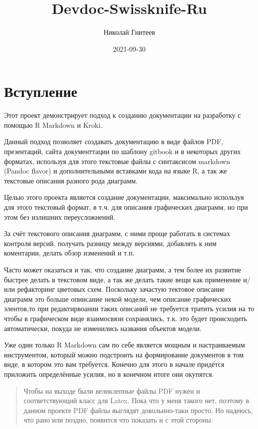 \documentclass[12pt,a4paper,12pt,oneside,openany]{book}
\title{Devdoc-Swissknife-Ru}
\author{Николай Гнитеев}
\date{2021-09-30}
\begin{document}
\maketitle

{
\hypersetup{linkcolor=black}
\setcounter{tocdepth}{2}
\tableofcontents
}
\chapter*{Вступление}


Этот проект демонстрирует подход к созданию документации на разработку с помощью R Markdown и Kroki.

Данный подход позволяет создавать документацию в виде файлов PDF, презентаций, сайта документтации по шаблону gitbook и в некоторых других форматах, используя для этого текстовые файлы с синтаксисом markdown (Pandoc flavor) и дополнительными вставками кода на языке R, а так же текстовые описания разного рода диаграмм.

Целью этого проекта является создание документации, максимально используя для этого текстовый формат, в т.ч. для описания графических диаграмм, но при этом без излишних переусложнений.

За счёт текстового описания диаграмм, с ними проще работать в системах контроля версий, получать разницу между версиями, добавлять к ним коментарии, делать обзор изменений и т.п.

Часто может оказаться и так, что создание диаграмм, а тем более их развитие быстрее делать в текстовом виде, а так же делать такие вещи как применение и/или рефакторинг цветовых схем. Поскольку зачастую тектовое описание диаграмм это больше опиисание некой модели, чем описание графических элентов,то при редактирвоании таких описаний не требуется тратить усилия на то чтобы в графическом виде взаимосвязи сохранялись, т.к. это будет происходить автоматически, покуда не изменились названия объектов модели.

Уже один только R Markdown сам по себе является мощным и настраиваемым инструментом, который можно подстроить на формирование документов в том виде, в котором это вам требуется. Конечно для этого в начале придётся приложить определённые усилия, но в конечном итоге они окупятся.

\begin{quote}
Чтобы на выходе были великлепные файлы PDF нужен и соответствующий класс для Latex. Пока что у меня такого нет, поэтому в данном проекте PDF файлы выглядят довольнно-таки просто. Но надеюсь, что рано или поздно, появится что показать и с этой стороны.
\end{quote}
\end{document}
